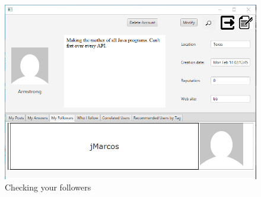 \documentclass[11pt]{report}
\begin{document}
\begin{figure}[H]
  \centering
  \includegraphics[width=\textwidth,keepaspectratio=true]{img/user_manual/SeguireUtente4.png}
  \caption{Checking your followers}
  \label{fig:SeguireUtente4}
\end{figure}
\end{document}
